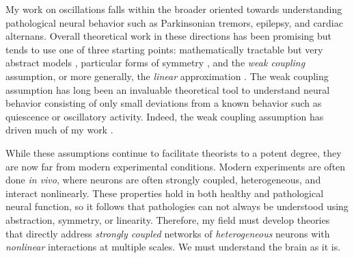 \documentclass[a4paper,11pt]{article}
\begin{document}
	
	
	My work on oscillations falls within the broader oriented towards understanding pathological neural behavior such as Parkinsonian tremors, epilepsy, and cardiac alternans. Overall theoretical work in these directions has been promising but tends to use one of three starting points: mathematically tractable but very abstract models \cite{ott2008low}, particular forms of symmetry \cite{golubitsky1986hopf}, and the \textit{weak coupling} assumption, or more generally, the \textit{linear} approximation \cite{ermentrout2002modeling}. The weak coupling assumption has long been an invaluable theoretical tool to understand neural behavior consisting of only small deviations from a known behavior such as quiescence or oscillatory activity. Indeed, the weak coupling assumption has driven much of my work \cite{park2016weakly,park2018multiple,park2018scalar}. 
	
	While these assumptions continue to facilitate theorists to a potent degree, they are now far from modern experimental conditions. Modern experiments are often done \textit{in vivo}, where neurons are often strongly coupled, heterogeneous, and interact nonlinearly. These properties hold in both healthy and pathological neural function, so it follows that pathologies can not always be understood using abstraction, symmetry, or linearity. Therefore, my field must develop theories that directly address \textit{strongly coupled} networks of \textit{heterogeneous} neurons with \textit{nonlinear} interactions at multiple scales. We must understand the brain as it is.
	
\end{document}
